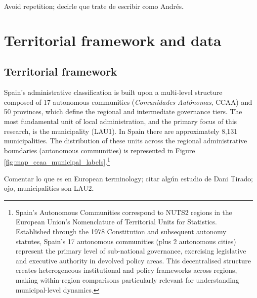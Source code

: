 \documentclass[a4paper,11pt,oneside]{article}
\begin{document}



{\color{red} Avoid repetition; decirle que trate de escribir como Andrés.}


\section{Territorial framework and data}
\label{sec:territorial_structure}

\subsection{Territorial framework}
\label{sec:territorial_framework}


Spain's administrative classification is built upon a multi-level structure composed of 17 autonomous communities (\textsl{Comunidades Autónomas}, CCAA) and 50 provinces, which define the regional and intermediate governance tiers. The most fundamental unit of local administration, and the primary focus of this research, is the municipality (LAU1). In Spain there are  approximately 8,131 municipalities. The distribution of these units across the regional administrative boundaries (autonomous communities) is represented in Figure \ref{fig:map_ccaa_municipal_labels}.\footnote{Spain's Autonomous Communities  correspond to NUTS2 regions in the European Union's Nomenclature of Territorial Units for Statistics. Established through the 1978 Constitution and subsequent autonomy statutes, Spain's 17 autonomous communities (plus 2 autonomous cities) represent the primary level of sub-national governance, exercising legislative and executive authority in devolved policy areas. This decentralised structure creates heterogeneous institutional and policy frameworks across regions, making within-region comparisons particularly relevant for understanding municipal-level dynamics.}

{\color{red} Comentar lo que es en European terminology; citar algún estudio de Dani Tirado; ojo, municipalities son LAU2.}
\end{document}
